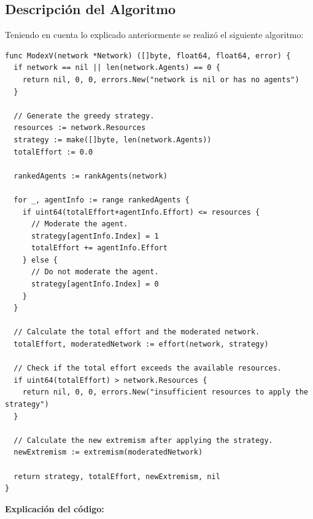 \documentclass[letterpaper,10pt]{article}
\begin{document}
\subsection{Descripción del Algoritmo}
\label{subsec:descripcion_algoritmo_voraz}
Teniendo en cuenta lo explicado anteriormente se realizó el siguiente algoritmo:
\begin{lstlisting}[caption={Algoritmo Voraz}, label={lst:ModexV}]
func ModexV(network *Network) ([]byte, float64, float64, error) {
  if network == nil || len(network.Agents) == 0 {
    return nil, 0, 0, errors.New("network is nil or has no agents")
  }

  // Generate the greedy strategy.
  resources := network.Resources
  strategy := make([]byte, len(network.Agents))
  totalEffort := 0.0

  rankedAgents := rankAgents(network)

  for _, agentInfo := range rankedAgents {
    if uint64(totalEffort+agentInfo.Effort) <= resources {
      // Moderate the agent.
      strategy[agentInfo.Index] = 1
      totalEffort += agentInfo.Effort
    } else {
      // Do not moderate the agent.
      strategy[agentInfo.Index] = 0
    }
  }

  // Calculate the total effort and the moderated network.
  totalEffort, moderatedNetwork := effort(network, strategy)

  // Check if the total effort exceeds the available resources.
  if uint64(totalEffort) > network.Resources {
    return nil, 0, 0, errors.New("insufficient resources to apply the strategy")
  }

  // Calculate the new extremism after applying the strategy.
  newExtremism := extremism(moderatedNetwork)

  return strategy, totalEffort, newExtremism, nil
}
\end{lstlisting}
\textbf{Explicación del código:}
\end{document}
